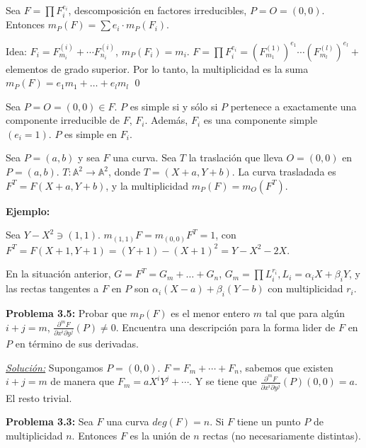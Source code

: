 \begin{Prop}
Sea $F=\prod F_i^{e_i}$, descomposición en factores irreducibles, $P=O=(0,0)$. Entonces $m_P(F)=\sum e_i\cdot m_P(F_i)$. 
\end{Prop}

\begin{Dem}
Idea: $F_i= F^{(i)}_{m_i}+\cdots F_{n_i}^{(i)}$, $m_P(F_i)=m_i$. $F=\prod F_i^{e_i} = (F_{m_1}^{(1)})^{e_1}\cdots (F_{m_l}^{(l)})^{e_l}+$ elementos de grado superior. Por lo tanto, la multiplicidad es la suma $m_P(F)=e_1m_1+\dots + e_lm_l$ \qed
\end{Dem}

\begin{Cor}
Sea $P=O=(0,0)\in F$. $P$ es simple si y sólo si $P$ pertenece a exactamente una componente irreducible de $F$, $F_i$. Además, $F_i$ es una componente simple $(e_i=1)$. $P$ es simple en $F_i$. 
\end{Cor}

\begin{Def}
Sea $P=(a,b)$ y sea $F$ una curva. Sea $T$ la traslación que lleva $O=(0,0)$ en $P=(a,b)$. $T:\mathbb{A}^2 \rightarrow \mathbb{A}^2$, donde $T=(X+a,Y+b)$. La curva trasladada es $F^T=F(X+a,Y+b)$, y la multiplicidad $m_P(F)= m_O(F^T)$. 
\end{Def}

\textbf{Ejemplo: }

Sea $Y-X^2 \ni (1,1)$. $m_{(1,1)}F = m_{(0,0)}F^T = 1$, con $F^T=F(X+1,Y+1)=(Y+1)-(X+1)^2 = Y-X^2-2X$. 

\vspace{3mm}
En la situación anterior,  $G=F^T=G_m+\dots +G_n$, $G_m=\prod L_i^{r_i}, L_i=\alpha_iX + \beta_i Y$, y las rectas tangentes a $F$ en $P$ son $\alpha_i(X-a)+\beta_i(Y-b)$ con multiplicidad $r_i$. 

\textbf{Problema 3.5:} Probar que $m_P(F)$ es el menor entero $m$ tal que para algún $i+j=m$, $\frac{\partial^m F}{\partial x^i \partial y^j}(P) \neq 0$.  Encuentra una descripción para la forma lider de $F$ en $P$ en término de sus derivadas. 

\underline{\textit{Solución:}}
Supongamos $P=(0,0)$. $F= F_m+\cdots + F_n$, sabemos que existen $i+j=m$ de manera que $F_m=aX^iY^j+ \cdots $. Y se tiene que $\frac{\partial^m F}{\partial x^i \partial y^j}(P)(0,0)=a$. El resto trivial. 

\textbf{Problema 3.3: } Sea $F$ una curva $deg(F)=n$. Si $F$ tiene un punto $P$ de multiplicidad $n$. Entonces $F$ es la unión de $n$ rectas (no necesariamente distintas). 

